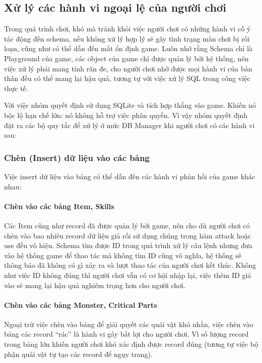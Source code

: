 \subsection{Xử lý các hành vi ngoại lệ của người chơi}

\hspace*{0.5cm} Trong quá trình chơi, khó mà tránh khỏi việc người chơi có những hành vi cố ý tác động đến schema, nếu không xử lý hợp lý sẽ gây tình trạng màn chơi bị rối loạn, cũng như có thể dẫn đến mất ổn định game. Luôn nhớ rằng Schema chỉ là Playground của game, các object của game chỉ được quản lý bởi hệ thống, nên việc xử lý phải mang tính răn đe, cho người chơi nhớ được mọi hành vi của bản thân đều có thể mang lại hậu quả, tương tự với việc xử lý SQL trong công việc thực tế.

\hspace*{0.5cm} Với việc nhóm quyết định sử dụng SQLite và tích hợp thẳng vào game. Khiến nó bộc lộ hạn chế lớn: nó không hỗ trợ việc phân quyền. Vì vậy nhóm quyết định đặt ra các bộ quy tắc để xử lý ở mức DB Manager khi người chơi có các hành vi sau:

\subsubsection{Chèn (Insert) dữ liệu vào các bảng}
Việc insert dữ liệu vào bảng có thể dẫn đến các hành vi phản hồi của game khác nhau:

\paragraph{Chèn vào các bảng Item, Skills}
Các Item cũng như record đã được quản lý bởi game, nên cho dù người chơi có chèn vào bao nhiêu record dữ liệu giả rồi sử dụng chúng trong hàm attack hoặc use đều vô hiệu. Schema tìm được ID trong quá trình xử lý câu lệnh nhưng đưa vào hệ thống game để thao tác mà không tìm ID cũng vô nghĩa, hệ thống sẽ thông báo đã không có gì xảy ra và lượt thao tác của người chơi kết thúc. Không như việc ID không đúng thì người chơi vẫn có cơ hội nhập lại, việc thêm ID giả vào sẽ mang lại hậu quả nghiêm trọng hơn cho người chơi.

\paragraph{Chèn vào các bảng Monster, Critical Parts}
Ngoại trừ việc chèn vào bảng để giải quyết các quái vật khó nhằn, việc chèn vào bảng các record ``rác'' là hành vi gây bất lợi cho người chơi. Vì số lượng record trong bảng lớn khiến người chơi khó xác định được record đúng (tương tự việc bộ phận quái vật tự tạo các record để ngụy trang).

